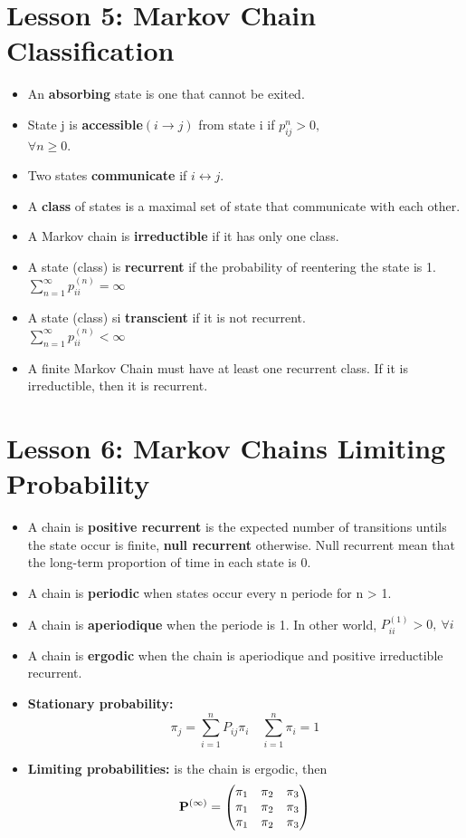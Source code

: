 \documentclass[10pt, french]{article}
\begin{document}
\begin{multicols*}{3}
\section*{Lesson 5: Markov Chain Classification}
\begin{itemize}[align=left,leftmargin=*]
    \item An \textbf{absorbing} state is one that cannot be exited.
    \item State j is \textbf{accessible}$(i \rightarrow j)$ from state i if $p_{ij}^n > 0,$ \\ $ \forall n \geq 0$.
    \item Two states \textbf{communicate} if $i \leftrightarrow j$.
    \item A \textbf{class} of states is a maximal set of state that communicate with each other.
    \item A Markov chain is \textbf{irreductible} if it has only one class.
    \item A state (class) is \textbf{recurrent} if the probability of reentering the state is 1. $\sum_{n=1}^\infty p_{ii}^{(n)} = \infty$
    \item A state (class) si \textbf{transcient} if it is not recurrent.\\ $\sum_{n=1}^\infty p_{ii}^{(n)} < \infty$
    \item A finite Markov Chain must have at least one recurrent class. If it is irreductible, then it is recurrent.
\end{itemize}

\section*{Lesson 6: Markov Chains Limiting Probability}
\label{Stochastic Processes}
\begin{itemize}[align=left,leftmargin=*]
    \item A chain is \textbf{positive recurrent} is the expected number of transitions untils the state occur is finite, \textbf{null recurrent} otherwise. Null recurrent mean that the long-term proportion of time in each state is 0.
    \item A chain is \textbf{periodic} when states occur every n periode for n > 1. 
    \item A chain is \textbf{aperiodique} when the periode is 1. In other world, $P_{ii}^{(1)} > 0,\: \forall i$
    \item A chain is \textbf{ergodic} when the chain is aperiodique and positive irreductible recurrent. 
    \item \textbf{Stationary probability:} \[ \pi_j = \sum_{i=1}^n P_{ij}\pi_i \quad \sum_{i=1}^n \pi_i = 1\]
    \item \textbf{Limiting probabilities:} is the chain is ergodic, then  
    \[ 
    \mathbf{P}^{(\infty)} = 
    \begin{pmatrix}
    \pi_1 & \pi_2 & \pi_3 \\
    \pi_1 & \pi_2 & \pi_3 \\
    \pi_1 & \pi_2 & \pi_3
    \end{pmatrix}   
    \]
\end{itemize}


\end{multicols*}
\end{document}

